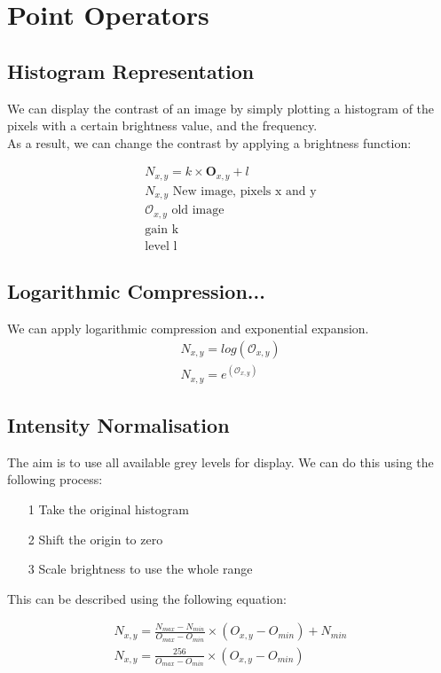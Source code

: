 \section{Point Operators}

\subsection{Histogram Representation}
We can display the contrast of an image by simply plotting a histogram of the pixels with a certain brightness value, and the frequency.
\\
As a result, we can change the contrast by applying a brightness function:

\begin{align}
    N_{x,y} = k\times \mathbf{O}_{x,y}+l \\
    N_{x,y}\text{ New image, pixels x and y} \\
    \mathcal{O}_{x,y}\text{ old image} \\
    \text{gain k} \\
    \text{level l}
\end{align}

\subsection{Logarithmic Compression...}
We can apply logarithmic compression and exponential expansion.
\begin{align}
    N_{x,y} = log(\mathcal{O}_{x,y}) \\
    N_{x,y} = e^{(\mathcal{O}_{x,y})}
\end{align}

\subsection{Intensity Normalisation}

The aim is to use all available grey levels for display. We can do this using the following process:
\begin{itemize}
    \itemsep0em
    \item [1] Take the original histogram
    \item [2] Shift the origin to zero
    \item [3] Scale brightness to use the whole range
\end{itemize}

This can be described using the following equation:

\begin{align}
    N_{x,y} = \frac{N_{max} - N_{min}}{O_{max}-O_{min}} \times (O_{x,y} - O_{min}) + N_{min} \\
    N_{x,y} = \frac{256}{O_{max}-O_{min}} \times (O_{x,y} - O_{min})
\end{align}

